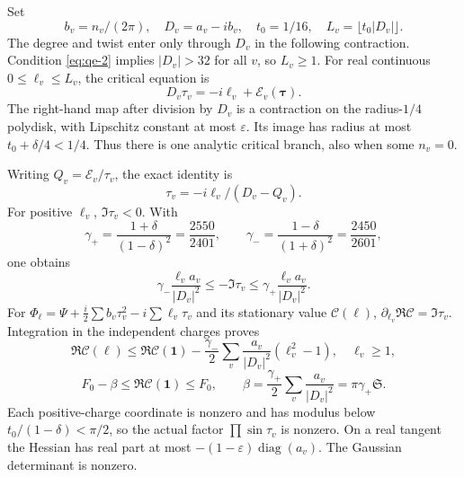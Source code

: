 Set
\begin{equation}
b_v=n_v/(2\pi),\quad D_v=a_v-ib_v,\quad t_0=1/16,\quad
                   L_v=\lfloor t_0|D_v|\rfloor.
\label{eq:qe-21}
\end{equation}
The degree and twist enter only through $D_v$ in the following
contraction. Condition \eqref{eq:qe-2} implies \(|D_v|>32\) for all
\(v\), so \(L_v\ge1\). For real continuous
\(0\le\ell_v\le L_v\), the critical equation is
\begin{equation}
D_v\tau_v=-i\ell_v+\mathcal E_v(\boldsymbol\tau).
\label{eq:qe-22}
\end{equation}
The right-hand map after division by \(D_v\) is a contraction on the radius-\(1/4\) polydisk, with Lipschitz constant at most \(\varepsilon\). Its image has radius at most \(t_0+\delta/4<1/4\). Thus there is one analytic critical branch, also when some \(n_v=0\).

Writing \(Q_v=\mathcal E_v/\tau_v\), the exact identity is
\begin{equation}
\tau_v=-i\ell_v/(D_v-Q_v).
\label{eq:qe-23}
\end{equation}
For positive \(\ell_v\), \(\Im\tau_v<0\). With
\begin{equation}
\gamma_+=\frac{1+\delta}{(1-\delta)^2}=\frac{2550}{2401},
 \qquad
 \gamma_-=\frac{1-\delta}{(1+\delta)^2}=\frac{2450}{2601},
\label{eq:qe-24}
\end{equation}
one obtains
\begin{equation}
\gamma_-\frac{\ell_va_v}{|D_v|^2}
       \le-\Im\tau_v\le
 \gamma_+\frac{\ell_va_v}{|D_v|^2}.
\label{eq:qe-25}
\end{equation}
For \(\Phi_\ell=\Psi+\tfrac i2\sum b_v\tau_v^2-i\sum\ell_v\tau_v\) and its stationary value \(\mathcal C(\ell)\), \(\partial_{\ell_v}\Re\mathcal C=\Im\tau_v\). Integration in the independent charges proves
\begin{equation}
\Re\mathcal C(\ell)\le\Re\mathcal C(\mathbf1)
  -\frac{\gamma_-}{2}\sum_v
             \frac{a_v}{|D_v|^2}(\ell_v^2-1),\quad\ell_v\ge1,
\label{eq:qe-26}
\end{equation}
\begin{equation}
F_0-\beta\le\Re\mathcal C(\mathbf1)\le F_0,\qquad
 \beta=\frac{\gamma_+}{2}\sum_v\frac{a_v}{|D_v|^2}
                                  =\pi\gamma_+\mathfrak S.
\label{eq:qe-27}
\end{equation}
Each positive-charge coordinate is nonzero and has modulus below \(t_0/(1-\delta)<\pi/2\), so the actual factor \(\prod\sin\tau_v\) is nonzero. On a real tangent the Hessian has real part at most \(-(1-\varepsilon)\operatorname{diag}(a_v)\). The Gaussian determinant is nonzero.

